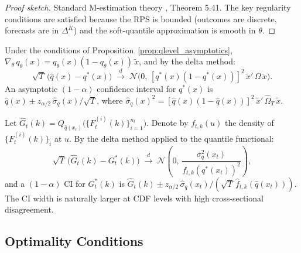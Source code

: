 \begin{proof}[Proof sketch]
Standard M-estimation theory \cite{van2000asymptotic}, Theorem 5.41.
The key regularity conditions are satisfied because the RPS is bounded (outcomes are discrete,
forecasts are in $\Delta^K$) and the soft-quantile approximation is smooth in $\theta$.
\end{proof}

\begin{corollary}
\label{cor:qlevel_ci}
Under the conditions of Proposition~\ref{prop:qlevel_asymptotics},
$\nabla_\theta\, q_\theta(x) = q_\theta(x)(1 - q_\theta(x))\,\tilde x$,
and by the delta method:
\begin{equation}
  \sqrt{T}\,\bigl(\hat q(x) - q^*(x)\bigr)
    \;\xrightarrow{d}\; \mathcal{N}\bigl(0,\, [q^*(x)(1 - q^*(x))]^2\, \tilde x'\,\Omega\,\tilde x\bigr).
\end{equation}
An asymptotic $(1-\alpha)$ confidence interval for $q^*(x)$ is
$\hat q(x) \pm z_{\alpha/2}\,\hat\sigma_q(x)/\sqrt{T}$,
where $\hat\sigma_q(x)^2 = [\hat q(x)(1-\hat q(x))]^2\,\tilde x'\,\hat\Omega_T\,\tilde x$.
\end{corollary}

\begin{corollary}
\label{cor:forecast_ci}
Let $\hat G_t(k) = Q_{\hat q(x_t)}\bigl(\{F^{(i)}_t(k)\}_{i=1}^{n_t}\bigr)$.
Denote by $f_{t,k}(u)$ the density of $\{F^{(i)}_t(k)\}_i$ at $u$.
By the delta method applied to the quantile functional:
\begin{equation}
  \sqrt{T}\,\bigl(\hat G_t(k) - G^*_t(k)\bigr)
    \;\xrightarrow{d}\; \mathcal{N}\!\left(0,\,
    \frac{\sigma^2_q(x_t)}{f_{t,k}(q^*(x_t))^2}
    \right),
\end{equation}
and a $(1-\alpha)$ CI for $G^*_t(k)$ is
$\hat G_t(k) \pm z_{\alpha/2}\,\hat\sigma_q(x_t)/(\sqrt{T}\,\hat f_{t,k}(\hat q(x_t)))$.
The CI width is naturally larger at CDF levels with high cross-sectional disagreement.
\end{corollary}

\subsection*{Optimality Conditions}

